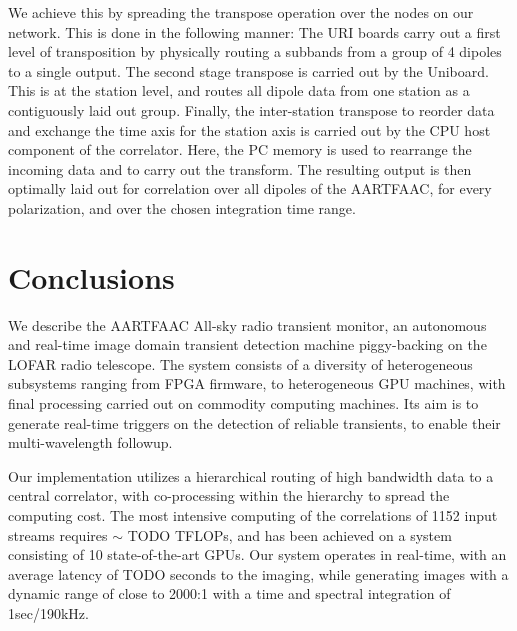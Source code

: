 \documentclass{ws-jai}
\begin{document}
We  achieve this  by spreading  the transpose  operation over  the nodes  on our
network. This is done in the following  manner: The URI boards carry out a first
level  of transposition  by physically  routing  a subbands  from a  group of  4
dipoles to a  single output.  The second  stage transpose is carried  out by the
Uniboard.  This  is at the  station level, and routes  all dipole data  from one
station as a contiguously laid  out group.  Finally, the inter-station transpose
to reorder data and  exchange the time axis for the station  axis is carried out
by the  CPU host component  of the  correlator. Here, the  PC memory is  used to
rearrange the incoming data and to carry out the transform. The resulting output
is then optimally laid out for correlation over all dipoles of the AARTFAAC, for
every polarization, and over the chosen integration time range.


\section {\label{sec:conclusion} Conclusions}
We  describe the  AARTFAAC All-sky  radio transient  monitor, an  autonomous and
real-time image  domain transient detection  machine piggy-backing on  the LOFAR
radio telescope. The  system consists of a diversity  of heterogeneous subsystems
ranging  from  FPGA  firmware,  to   heterogeneous  GPU  machines,  with  final
processing carried out on commodity computing  machines.  Its aim is to generate
real-time  triggers on  the detection  of reliable  transients, to  enable their
multi-wavelength followup.

Our implementation utilizes  a hierarchical routing of high bandwidth  data to a
central  correlator,  with co-processing  within  the  hierarchy to  spread  the
computing cost.  The most intensive computing  of the correlations of 1152 input
streams requires $\sim$  TODO TFLOPs, and has been achieved on  a system consisting
of 10 state-of-the-art GPUs.  Our system  operates in real-time, with an average
latency of TODO  seconds to the imaging, while generating  images with a dynamic
range of close to 2000:1 with a time and spectral integration of 1sec/190kHz.\\
\end{document}
